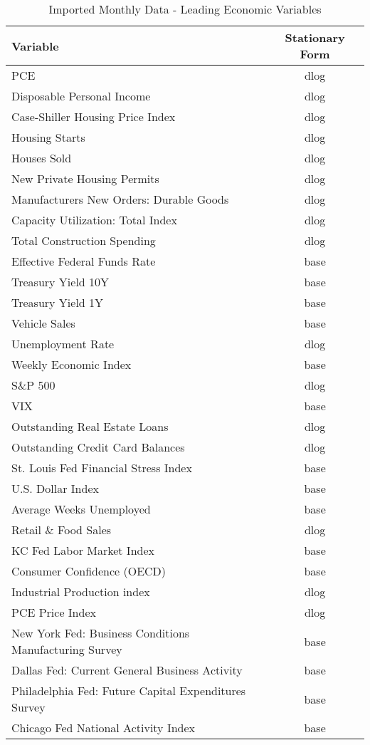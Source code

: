 \documentclass[11pt, letterpaper]{article}\usepackage[]{graphicx}\usepackage[]{color}
\begin{document}
\begin{table}[H]
\centering
\begingroup\scriptsize
\begin{tabular}{lc}
  \hline
Variable & Stationary Form \\ 
  \hline
PCE & dlog \\ 
  Disposable Personal Income & dlog \\ 
  Case-Shiller Housing Price Index & dlog \\ 
  Housing Starts & dlog \\ 
  Houses Sold & dlog \\ 
  New Private Housing Permits & dlog \\ 
  Manufacturers New Orders: Durable Goods & dlog \\ 
  Capacity Utilization: Total Index & dlog \\ 
  Total Construction Spending & dlog \\ 
  Effective Federal Funds Rate & base \\ 
  Treasury Yield 10Y & base \\ 
  Treasury Yield 1Y & base \\ 
  Vehicle Sales & base \\ 
  Unemployment Rate & dlog \\ 
  Weekly Economic Index & base \\ 
  S\&P 500 & dlog \\ 
  VIX & base \\ 
  Outstanding Real Estate Loans & dlog \\ 
  Outstanding Credit Card Balances & dlog \\ 
  St. Louis Fed Financial Stress Index & base \\ 
  U.S. Dollar Index & base \\ 
  Average Weeks Unemployed & base \\ 
  Retail \& Food Sales & dlog \\ 
  KC Fed Labor Market Index & base \\ 
  Consumer Confidence (OECD) & base \\ 
  Industrial Production index & dlog \\ 
  PCE Price Index & dlog \\ 
  New York Fed: Business Conditions Manufacturing Survey & base \\ 
  Dallas Fed: Current General Business Activity & base \\ 
  Philadelphia Fed: Future Capital Expenditures Survey & base \\ 
  Chicago Fed National Activity Index & base \\ 
   \hline
\end{tabular}
\endgroup
\caption{Imported Monthly Data - Leading Economic Variables} 
\end{table}
\end{document}
